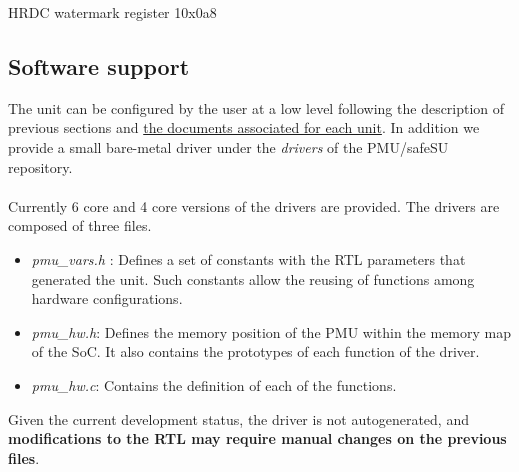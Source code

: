 \begin{register}{H}{RDC watermark register 1}{0x0a8}
	\label{RDC_water1}
	\regnewline
\end{register}


\subsection{Software support}
The unit can be configured by the user at a low level following the description of previous sections and \href{https://gitlab.bsc.es/caos_hw/hdl_ip/bsc_pmu/-/tree/develop/docs}{the documents associated for each unit}. In addition we provide a small bare-metal driver under the \textit{drivers} of the PMU/safeSU repository.\\
\\
Currently 6 core and 4 core versions of the drivers are provided. The drivers are composed of three files.
\begin{itemize}
\item \textit{pmu\_vars.h }: Defines a set of constants with the RTL parameters that generated the unit. Such constants allow the reusing of functions among hardware configurations.
\item\textit{ pmu\_hw.h}: Defines the memory position of the PMU within the memory map of the SoC. It also contains the prototypes of each function of the driver.
\item \textit{pmu\_hw.c}: Contains the definition of each of the functions.
\end{itemize}
Given the current development status, the driver is not autogenerated, and \textbf{modifications to the RTL may require manual changes on the previous files}. 

